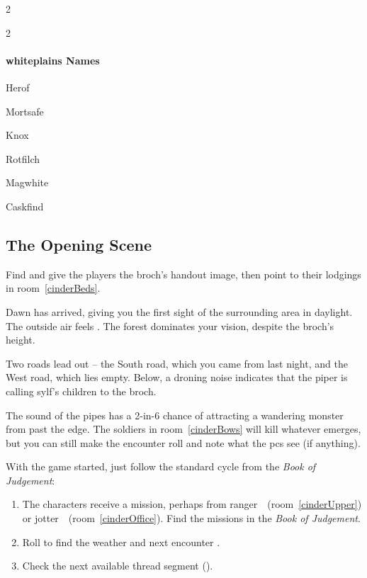 \begin{multicols}{2}
\begin{multicols}{2}
\paragraph{\Gls{whiteplains} Names}

\begin{dlist}
  \item
  Herof
  \item
  Mortsafe
  \item
  Knox
  \item
  Rotfilch
  \item
  Magwhite
  \item
  Caskfind
\end{dlist}

\end{multicols}

\subsection{The Opening Scene}

Find   and give the players the \gls{broch}'s handout image, then point to their lodgings in room~\ref{cinderBeds}.

\begin{boxtext}
  Dawn has arrived, giving you the first sight of the surrounding area in daylight.
  The outside air feels \showTemperature.
  The forest dominates your vision, despite the \gls{broch}'s height.

  Two roads lead out -- the South road, which you came from last night, and the West road, which lies empty.
  Below, a droning noise indicates that the piper is calling \gls{sylf}'s children to the \gls{broch}.
\end{boxtext}

The sound of the pipes has a 2-in-6 chance of attracting a wandering \gls{monster} from past the \gls{edge}.
The \glspl{soldier} in room~\ref{cinderBows} will kill whatever emerges, but you can still make the encounter roll and note what the \glspl{pc} see (if anything).

With the game started, just follow the standard cycle from the \textit{Book of Judgement}:

\null
\bigbreak

\begin{enumerate}
  \item
  The characters receive a mission, perhaps from \Gls{ranger}~\composeHumanName\ (room~\ref{cinderUpper}) or \Gls{jotter}~\composeHumanName\ (room~\ref{cinderOffice}).
  Find the missions in the \textit{Book of Judgement}\iftoggle{judgement}{ (\autopageref{NGmissions})}{}.
  \item
  Roll to find the weather and next encounter \iftoggle{judgement}{(\textit{Book of Judgement}, pages \pageref{weather} and \pageref{randomEncounters})}{on the \gls{gm}-shield}.
  \item
  Check the next available \gls{thread} \gls{segment} ().
\end{enumerate}


\end{multicols}
